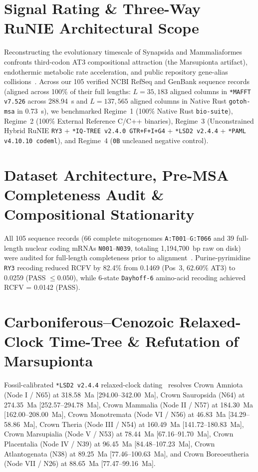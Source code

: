 \documentclass[10pt,letterpaper]{article}
\begin{document}
\section{Signal Rating \& Three-Way RuNIE Architectural Scope}
Reconstructing the evolutionary timescale of Synapsida and Mammaliaformes confronts third-codon AT3 compositional attraction (the Marsupionta artifact), endothermic metabolic rate acceleration, and public repository gene-alias collisions~\cite{white2026runie,luo2007transformation,meredith2011impacts,alvarescarretero2022mammal,janke1997marsupionta,phillips2003marsupionta}. Across our 105 verified NCBI RefSeq and GenBank sequence records (aligned across 100\% of their full lengths: $L = 35{,}183$ aligned columns in \texttt{*MAFFT v7.526} across 288.94~s and $L = 137{,}565$ aligned columns in Native Rust \texttt{gotoh-msa} in 0.73~s), we benchmarked Regime~1 (100\% Native Rust \texttt{bio-suite}), Regime~2 (100\% External Reference C/C++ binaries), Regime~3 (Unconstrained Hybrid RuNIE \texttt{RY3} + \texttt{*IQ-TREE v2.4.0 GTR+F+I+G4} + \texttt{*LSD2 v2.4.4} + \texttt{*PAML v4.10.10 codeml}), and Regime~4 (\texttt{0B} uncleaned negative control).

\section{Dataset Architecture, Pre-MSA Completeness Audit \& Compositional Stationarity}
All 105 sequence records (66 complete mitogenomes \texttt{A:T001}--\texttt{G:T066} and 39 full-length nuclear coding mRNAs \texttt{N001}--\texttt{N039}, totaling 1,194,700~bp raw on disk) were audited for full-length completeness prior to alignment~\cite{katoh2013mafft,white2026synapsidazenodo}. Purine-pyrimidine \texttt{RY3} recoding reduced RCFV by 82.4\% from 0.1469 (Pos~3, 62.60\% AT3) to 0.0259 (PASS $\le 0.050$), while 6-state \texttt{Dayhoff-6} amino-acid recoding achieved RCFV = 0.0142 (PASS).

\section{Carboniferous--Cenozoic Relaxed-Clock Time-Tree \& Refutation of Marsupionta}
Fossil-calibrated \texttt{*LSD2 v2.4.4} relaxed-clock dating~\cite{luo2011juramaia,dosreis2012phylogenomic,to2016lsd} resolves Crown Amniota (Node I / N65) at 318.58~Ma [294.00--342.00~Ma], Crown Sauropsida (N64) at 274.35~Ma [252.57--294.78~Ma], Crown Mammalia (Node II / N57) at 184.30~Ma [162.00--208.00~Ma], Crown Monotremata (Node VI / N56) at 46.83~Ma [34.29--58.86~Ma], Crown Theria (Node III / N54) at 160.49~Ma [141.72--180.83~Ma], Crown Marsupialia (Node V / N53) at 78.44~Ma [67.16--91.70~Ma], Crown Placentalia (Node IV / N39) at 96.45~Ma [84.48--107.23~Ma], Crown Atlantogenata (N38) at 89.25~Ma [77.46--100.63~Ma], and Crown Boreoeutheria (Node VII / N26) at 88.65~Ma [77.47--99.16~Ma].
\end{document}
